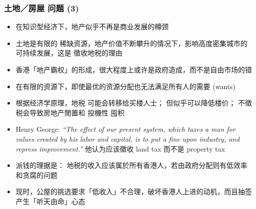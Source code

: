 \documentclass[10pt]{beamer}
\newcommand{\emp}[1]{{\color{blue}#1}}
\begin{document}
\begin{frame}
\frametitle{土地／房屋 问题 (3)}
\begin{itemize}
	\item 在知识型经济下，地产似乎不再是商业发展的樽颈
	
	\item 土地是有限的 \emp{稀缺资源}，地产价值不断攀升的情况下，影响高度密集城市的 可持续发展，这是 徵收地税的理由
	
	\item 香港「地产霸权」的形成，很大程度上或许是政府造成，而不是自由市场的错

	\nocite{Ryan-Collins2017}
	\nocite{Farvacque-Vitkoviac1992}
	\nocite{Blomley2004}
	\nocite{Linklater2013}
	\nocite{Adams2015}
	\nocite{简德三2012}
	\nocite{Poon2011}
	\nocite{潘慧娴2010}
	\nocite{OSullivan2012}
	\nocite{Rithmire2015}
	\nocite{Squires2013}
	\nocite{Harvey1996}
	\nocite{Girling1997}
	\nocite{Balia2009}
	\nocite{Peteri2003}
	\nocite{陈云2011}
	\nocite{周其仁2018}
	\nocite{Field2008}
	\nocite{Posner2018}

	\item 在有限的资源下，即使最优的资源分配也无法满足所有人的需要 (wants)

	\item 根据经济学原理，地税 可能会转移给买楼人士； 但似乎可以降低楼价； 不徵税会导致房地产閒置和 投機性 囤积
	
	\item Henry George: \textrm{\textit{``The effect of our present system, which taxes a man for values created by his labor and capital, is to put a fine upon industry, and repress improvement.''}} 他认为应该徵收 land tax 而不是 property tax

	\item 派钱的理据是： 地税的收入应该属於所有香港人，若由政府分配则有低效率和贪腐的问题
	
	\item 现时，公屋的挑选要求「低收入」不合理，破坏香港人上进的动机，而且抽签 产生「听天由命」心态




\end{itemize}
\end{frame}
\end{document}
